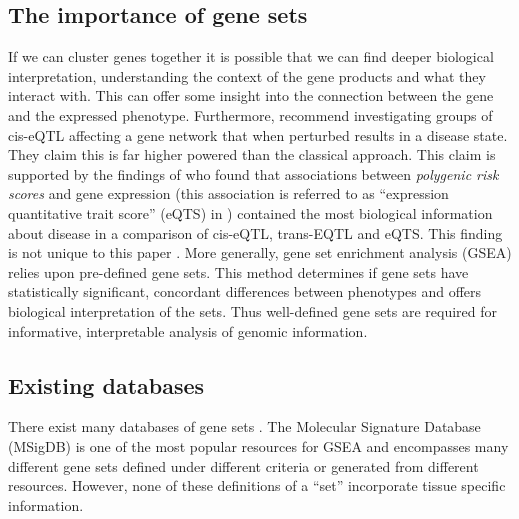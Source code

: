 \documentclass[11pt]{article} %
\begin{document}
	\subsection{The importance of gene sets}
	If we can cluster genes together it is possible that we can find deeper biological interpretation, understanding the context of the gene products and what they interact with. This can offer some insight into the connection between the gene and the expressed phenotype. Furthermore, \citet{nica_expression_2013} recommend investigating groups of cis-eQTL affecting a gene network that when perturbed results in a disease state. They claim this is far higher powered than the classical approach. This claim is supported by the findings of \citet{vosa_unraveling_2018} who found that associations between \emph{polygenic risk scores} and gene expression (this association is referred to as ``expression quantitative trait score'' (eQTS) in \cite{vosa_unraveling_2018}) contained the most biological information about disease in a comparison of cis-eQTL, trans-EQTL and eQTS. This finding is not unique to this paper \cite{dudbridge_power_2013}\cite{wray_research_2014}. More generally, gene set enrichment analysis (GSEA) \cite{subramanian_gene_2005}\cite{mooney_gene_2015} relies upon pre-defined gene sets. This method determines if gene sets have statistically significant, concordant differences between phenotypes and offers biological interpretation of the sets. Thus well-defined gene sets are required for informative, interpretable analysis of genomic information.
	
	
	\subsection{Existing databases}
	There exist many databases of gene sets \cite{ashburner_gene_2000}\cite{kanehisa_new_2019}\cite{szklarczyk_string_2019}. The Molecular Signature Database \cite{subramanian_gene_2005} (MSigDB) is one of the most popular resources for GSEA and encompasses many different gene sets defined under different criteria or generated from different resources. However, none of these definitions of a ``set'' incorporate tissue specific information. 
	
\end{document}
